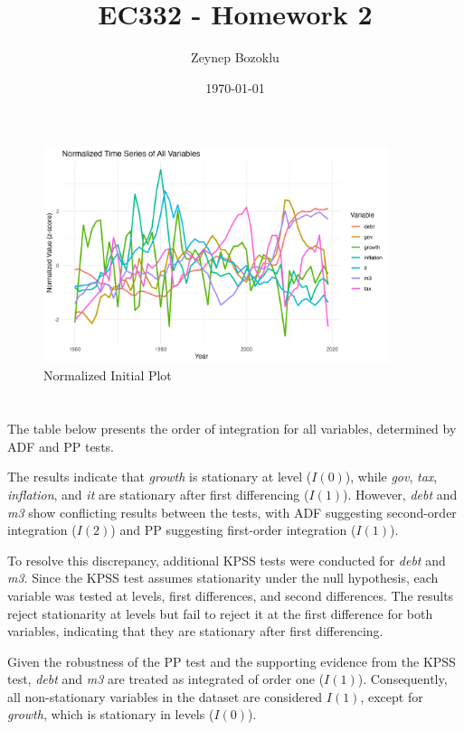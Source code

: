 \documentclass[a4paper,12pt]{article}
\title{EC332 - Homework 2}
\author{Zeynep Bozoklu}
\date{\today}
\begin{document}
\maketitle


\begin{figure}[H]
  \centering
  \includegraphics[width=0.9\textwidth]{../results/all_variables_normalized_plot.png}
  \caption{Normalized Initial Plot}
\end{figure}


\section{}
The table below presents the order of integration for all variables, determined by ADF and PP tests.



The results indicate that \textit{growth} is stationary at level (\(I(0)\)), while \textit{gov}, \textit{tax}, \textit{inflation}, and \textit{it} are stationary after first differencing (\(I(1)\)). However, \textit{debt} and \textit{m3} show conflicting results between the tests, with ADF suggesting second-order integration (\(I(2)\)) and PP suggesting first-order integration (\(I(1)\)). 

To resolve this discrepancy, additional KPSS tests were conducted for \textit{debt} and \textit{m3}. Since the KPSS test assumes stationarity under the null hypothesis, each variable was tested at levels, first differences, and second differences. The results reject stationarity at levels but fail to reject it at the first difference for both variables, indicating that they are stationary after first differencing.



Given the robustness of the PP test and the supporting evidence from the KPSS test, \textit{debt} and \textit{m3} are treated as integrated of order one (\(I(1)\)). Consequently, all non-stationary variables in the dataset are considered \(I(1)\), except for \textit{growth}, which is stationary in levels (\(I(0)\)).
\end{document}
